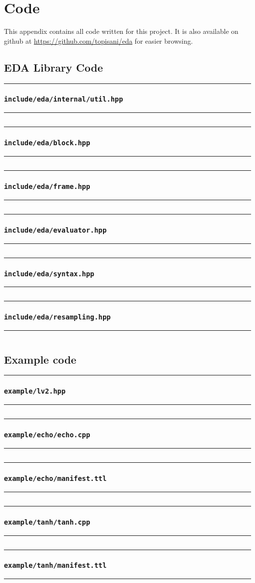 \chapter{Code}
This appendix contains all code written for this project. It is also available on github at
\url{https://github.com/topisani/eda} for easier browsing.

\section{EDA Library Code}

\newcommand{\inputcode}[2]{
  \hrule %
  \subsection*{\texttt{#2}}
  \label{codefile:#2}
  \hrule
  \inputminted[linenos, mathescape]{#1}{eda/#2}
}

\inputcode{cpp}{include/eda/internal/util.hpp}
\inputcode{cpp}{include/eda/block.hpp}
\inputcode{cpp}{include/eda/frame.hpp}
\inputcode{cpp}{include/eda/evaluator.hpp}
\inputcode{cpp}{include/eda/syntax.hpp}
\inputcode{cpp}{include/eda/resampling.hpp}

\section{Example code}
\inputcode{cpp}{example/lv2.hpp}
\inputcode{cpp}{example/echo/echo.cpp}
\inputcode{turtle}{example/echo/manifest.ttl}
\inputcode{cpp}{example/tanh/tanh.cpp}
\inputcode{turtle}{example/tanh/manifest.ttl}
